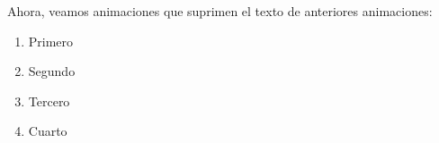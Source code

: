 \documentclass[a4paper,10pt]{beamer}
\begin{document}
 \begin{frame}
 
 Ahora, veamos animaciones que suprimen el texto de anteriores
 animaciones:
 
  
   \begin{enumerate} [<+>]
  \item Primero
  \item Segundo
  \item Tercero
  \item Cuarto
 \end{enumerate}
  
\end{frame}
\end{document}
